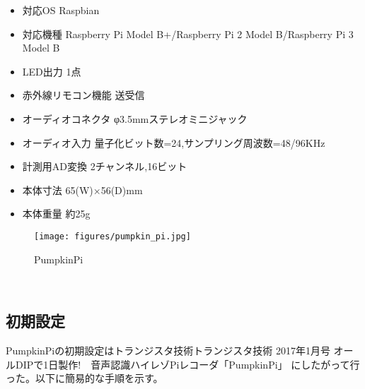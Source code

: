 \begin{itemize}
\tightlist
\item
  対応OS Raspbian
\item
  対応機種 Raspberry Pi Model B+/Raspberry Pi 2 Model B/Raspberry Pi 3
  Model B
\item
  LED出力 1点
\item
  赤外線リモコン機能 送受信
\item
  オーディオコネクタ φ3.5mmステレオミニジャック
\item
  オーディオ入力 量子化ビット数=24,サンプリング周波数=48/96KHz
\item
  計測用AD変換 2チャンネル,16ビット
\item
  本体寸法 65(W)×56(D)mm
\item
  本体重量 約25g
\end{itemize}

\begin{figure}[H]
\centering
\texttt{[image: figures/pumpkin\_pi.jpg]}
\label{fig:pumpkin_pi}
\caption{PumpkinPi}
\end{figure}

\
\subsection{初期設定}\label{adc-setup}

PumpkinPiの初期設定はトランジスタ技術トランジスタ技術
2017年1月号 オールDIPで1日製作!　音声認識ハイレゾPiレコーダ「PumpkinPi」\cite{transistor:online} にしたがって行った。以下に簡易的な手順を示す。

